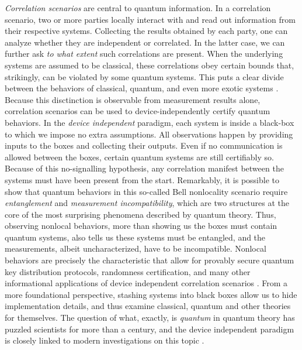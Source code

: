 \emph{Correlation scenarios} are central to quantum information. In a correlation scenario, two or more parties locally interact with and read out information from their respective systems. Collecting the results obtained by each party, one can analyze whether they are independent or correlated. In the latter case, we can further ask \emph{to what extent} such correlations are present. When the underlying systems are assumed to be classical, these correlations obey certain bounds that, strikingly, can be violated by some quantum systems. This puts a clear divide between the behaviors of classical, quantum, and even more exotic systems \cite{prbox}. Because this disctinction is observable from measurement results alone, correlation scenarios can be used to device-independently certify quantum behaviors. In the \emph{device independent} paradigm, each system is inside a black-box to which we impose no extra assumptions. All observations happen by providing inputs to the boxes and collecting their outputs. Even if no communication is allowed between the boxes, certain quantum systems are still certifiably so. Because of this no-signalling hypothesis, any correlation manifest between the systems must have been present from the start. Remarkably, it is possible to show that quantum behaviors in this so-called Bell nonlocality scenario require \emph{entanglement} and \emph{measurement incompatibility}, which are two structures at the core of the most surprising phenomena described by quantum theory. Thus, observing nonlocal behaviors, more than showing us the boxes must contain quantum systems, also tells us these systems must be entangled, and the measurements, albeit uncharacterized, have to be incompatible. Nonlocal behaviors are precisely the characteristic that allow for provably secure quantum key distribution protocols, randomness certification, and many other informational applications of device independent correlation scenarios \cite{brunner_2014_nonlocality}. From a more foundational perspective, stashing systems into black boxes allow us to hide implementation details, and thus examine classical, quantum and other theories for themselves. The question of what, exactly, is \emph{quantum} in quantum theory has puzzled scientists for more than a century, and the device independent paradigm is closely linked to modern investigations on this topic \cite{barrett_gpts_2007,plavala_gpts_2021,spekkens_2005_contextuality}.

